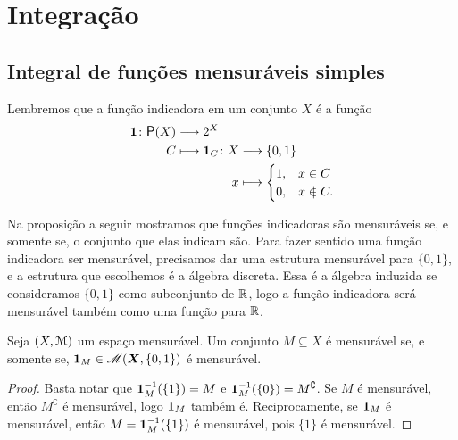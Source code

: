\section{Integração}

\subsection{Integral de funções mensuráveis simples}

Lembremos que a função indicadora em um conjunto $X$ é a função
	\begin{align*}
	\func{\idc}{\p(X)}{2^X}{C}{
		\begin{aligned}[t]
		\func{\idc_C}{X}{\{0,1\}}{x}{
			\begin{cases}
			1,& x \in C \\
			0,& x \notin C.
			\end{cases}
		}
		\end{aligned}
	}
	\end{align*}

Na proposição a seguir mostramos que funções indicadoras são mensuráveis se, e somente se, o conjunto que elas indicam são. Para fazer sentido uma função indicadora ser mensurável, precisamos dar uma estrutura mensurável para $\{0,1\}$, e a estrutura que escolhemos é a álgebra discreta. Essa é a álgebra induzida se consideramos $\{0,1\}$ como subconjunto de $\mathbb{R}$, logo a função indicadora será mensurável também como uma função para $\mathbb{R}$.

\begin{proposition}
Seja $(X,\mathcal{M})$ um espaço mensurável. Um conjunto $M \subseteq X$ é mensurável se, e somente se, ${\bm 1}_M \in \mathscr{M}(\bm X,\{0,1\})$ é mensurável.
\end{proposition}
\begin{proof}
Basta notar que ${\bm 1}_M^{-1}(\{1\}) = M$ e ${\bm 1}_M^{-1}(\{0\}) = M^\complement$. Se $M$ é mensurável, então $M^\complement$ é mensurável, logo ${\bm 1}_M$ também é. Reciprocamente, se ${\bm 1}_M$ é mensurável, então $M = {\bm 1}_M^{-1}(\{1\})$ é mensurável, pois $\{1\}$ é mensurável.
\end{proof}


